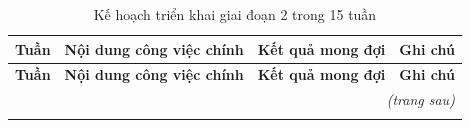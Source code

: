 \begin{center}
\begin{longtable}{|c|p{5cm}|p{4cm}|p{3cm}|}
    \caption{Kế hoạch triển khai giai đoạn 2 trong 15 tuần} \label{tab:kehoach15tuan} \\
    \hline
    \textbf{Tuần} & \textbf{Nội dung công việc chính} & \textbf{Kết quả mong đợi} & \textbf{Ghi chú} \\
    \hline
    \endfirsthead

    \hline
    \textbf{Tuần} & \textbf{Nội dung công việc chính} & \textbf{Kết quả mong đợi} & \textbf{Ghi chú} \\
    \hline
    \endhead

    \hline
    \multicolumn{4}{r}{\textit{(trang sau)}} \\
    \hline
    \endfoot

    \hline
    \endlastfoot


\end{longtable}
\end{center}

